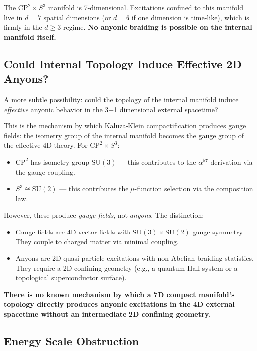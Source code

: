 \documentclass[11pt]{article}
\theoremstyle{definition}
\theoremstyle{remark}
\begin{document}
The $\mathrm{CP}^2 \times S^3$ manifold is 7-dimensional.  Excitations
confined to this manifold live in $d = 7$ spatial dimensions (or $d = 6$
if one dimension is time-like), which is firmly in the $d \geq 3$ regime.
\textbf{No anyonic braiding is possible on the internal manifold itself.}

\subsection{Could Internal Topology Induce Effective 2D Anyons?}

A more subtle possibility: could the topology of the internal manifold induce
\emph{effective} anyonic behavior in the 3+1 dimensional external spacetime?

This is the mechanism by which Kaluza-Klein compactification produces gauge
fields: the isometry group of the internal manifold becomes the gauge group
of the effective 4D theory.  For $\mathrm{CP}^2 \times S^3$:
\begin{itemize}
  \item $\mathrm{CP}^2$ has isometry group $\mathrm{SU}(3)$ --- this
    contributes to the $\alpha^{57}$ derivation via the gauge coupling.
  \item $S^3 \cong \mathrm{SU}(2)$ --- this contributes the $\mu$-function
    selection via the composition law.
\end{itemize}

However, these produce \emph{gauge fields}, not \emph{anyons}.  The distinction:
\begin{itemize}
  \item Gauge fields are 4D vector fields with $\mathrm{SU}(3) \times
    \mathrm{SU}(2)$ gauge symmetry.  They couple to charged matter via
    minimal coupling.
  \item Anyons are 2D quasi-particle excitations with non-Abelian braiding
    statistics.  They require a 2D confining geometry (e.g., a quantum Hall
    system or a topological superconductor surface).
\end{itemize}

\textbf{There is no known mechanism by which a 7D compact manifold's topology
directly produces anyonic excitations in the 4D external spacetime without
an intermediate 2D confining geometry.}

\subsection{Energy Scale Obstruction}
\end{document}
